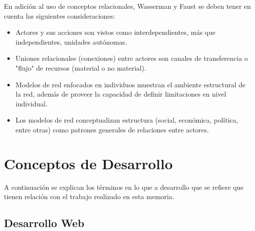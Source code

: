 En adición al uso de conceptos relacionales, Wasserman y Faust\cite{sna} se deben tener en cuenta las siguientes consideraciones:

  \begin{itemize}
    \item Actores y sus acciones son vistos como interdependientes, más que independientes, unidades autónomas.
    \item Uniones relacionales (conexiones) entre actores son canales de transferencia o "flujo" de recursos (material o no material).
    \item Modelos de red enfocados en individuos muestran el ambiente estructural de la red, además de proveer la capacidad de definir limitaciones en nivel individual.
    \item Los modelos de red conceptualizan estructura (social, económica, política, entre otras) como patrones generales de relaciones entre actores.
  \end{itemize}


% 
% 
% 


\section{Conceptos de Desarrollo} %
\label{sec:conceptos_de_desarrollo}

A continuación se explican los términos en lo que a desarrollo que se refiere que tienen relación con el trabajo realizado en esta memoria.

\subsection{Desarrollo Web} %
\label{sub:desarrollo_web}



